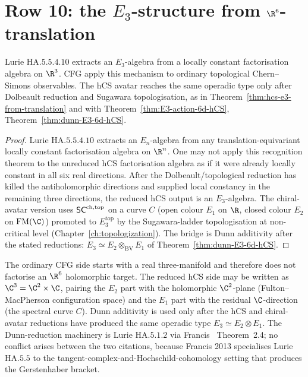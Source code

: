\section{\texorpdfstring{Row 10: the $E_3$-structure from $\R^6$-translation}{Row 10: the E3 structure from R6 translation}}
\label{sec:cfg-row-10-e3-translation}

\begin{theorem}
\label{thm:cfg-row-10}
Lurie $\mathrm{HA}.5.5.4.10$ extracts an $E_3$-algebra from a locally
constant factorisation algebra on $\R^3$. CFG apply this mechanism to
ordinary topological Chern--Simons observables. The hCS avatar reaches
the same operadic type only after Dolbeault reduction and Sugawara
topologisation, as in
Theorem~\ref{thm:hcs-e3-from-translation} and with
Theorem~\ref{thm:E3-action-6d-hCS}, Theorem~\ref{thm:dunn-E3-6d-hCS}.
\end{theorem}

\begin{proof}
Lurie $\mathrm{HA}.5.5.4.10$ extracts an $E_n$-algebra from any
translation-equivariant locally constant factorisation algebra on
$\R^n$. One may not apply this recognition theorem to the unreduced hCS
factorisation algebra as if it were already locally constant in all six
real directions. After the Dolbeault/topological reduction has killed
the antiholomorphic directions and supplied local constancy in the
remaining three directions, the reduced hCS output is an $E_3$-algebra.
The chiral-avatar version uses
$\mathsf{SC}^{\mathrm{ch},\mathrm{top}}$ on a curve $C$ (open colour $E_1$ on $\R$, closed colour
$E_2$ on $\mathrm{FM}(\C)$) promoted to $E_3^{\mathrm{top}}$ by the
Sugawara-ladder topologisation at non-critical level
(Chapter~\ref{ch:topologization}). The bridge is Dunn additivity after
the stated reductions:
$E_3\simeq E_2\otimes_{\mathrm{BV}} E_1$ of
Theorem~\ref{thm:dunn-E3-6d-hCS}.
\end{proof}

\begin{remark}
\label{rem:cfg-row-10-dunn}
The ordinary CFG side starts with a real three-manifold and therefore
does not factorise an $\R^6$ holomorphic target. The reduced hCS side
may be written as $\C^3=\C^2\times\C$, pairing the $E_2$ part with the
holomorphic $\C^2$-plane (Fulton--MacPherson configuration space) and
the $E_1$ part with the residual $\C$-direction (the spectral curve
$C$). Dunn additivity is used only after the hCS and chiral-avatar
reductions have produced the same operadic type
$E_3\simeq E_2\otimes E_1$. The
Dunn-reduction machinery is Lurie $\mathrm{HA}.5.1.2$ via
Francis~\cite{francis2013tangent} Theorem~2.4; no conflict arises
between the two citations, because Francis 2013 specialises Lurie
$\mathrm{HA}.5.5$ to the tangent-complex-and-Hochschild-cohomology
setting that produces the Gerstenhaber bracket.
\end{remark}

